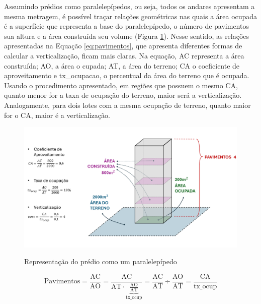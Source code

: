 Assumindo prédios como paralelepípedos, ou seja, todos os andares apresentam a mesma metragem, é possível traçar relações geométricas nas quais a área ocupada é a superfície que representa a base do paralelepípedo, o número de pavimentos sua altura e a área construída seu volume (Figura \ref{fig:desenho}). Nesse sentido, as relações apresentadas na Equação \ref{eq:pavimentos}, que apresenta diferentes formas de calcular a verticalização, ficam mais claras. Na equação, AC representa a área construída; AO, a área o cupada; AT, a área do terreno; CA o coeficiente de aproveitamento e tx\_ocupacao, o percentual da área do terreno que é ocupada. Usando o procedimento apresentado, em regiões que possuem o mesmo CA, quanto menor for a taxa de ocupação do terreno, maior será a verticalização. Analogamente, para dois lotes com a mesma ocupação de terreno, quanto maior for o CA, maior é a verticalização.

\begin{figure}[h]
    \centering
    \caption{Representação do prédio como um paralelepípedo}
    \includegraphics[width = \linewidth]{imagens/desenho.pdf}
    \label{fig:desenho}
\end{figure}

\begin{equation}
    \text{Pavimentos}=\frac{\text{AC}}{\text{AO}}=\frac{\text{AC}}{\text{AT}\cdot\underbrace{\frac{\text{AO}}{\text{AT}}}_\text{tx\_ocup}}=\frac{\text{AC}}{\text{AT}}\div\frac{\text{AO}}{\text{AT}}=\frac{\text{CA}}{\text{tx\_ocup}}
    \label{eq:pavimentos}
\end{equation}


